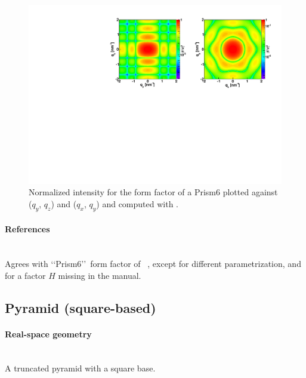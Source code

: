 \begin{figure}[h]
\begin{center}
\includegraphics[angle=-90,width=\textwidth]{fig/ff/figffprism6.pdf}
\end{center}
\caption{Normalized intensity for the form factor of a Prism6 plotted against ($q_y$, $q_z$) and ($q_x$, $q_y$) and computed with .}
\label{fig:FFprism6Ex}
\end{figure}

\paragraph{References}\strut\\
Agrees with \lq\lq Prism6\rq\rq\ form factor of \IsGISAXS~\cite{Laz02},
except for different parametrization,
and for a factor $H$ missing in the  manual. 

\clearpage
\subsection{Pyramid (square-based)}\label{sec:Pyramid}

\paragraph{Real-space geometry}\strut\\
A truncated pyramid with a square base.

